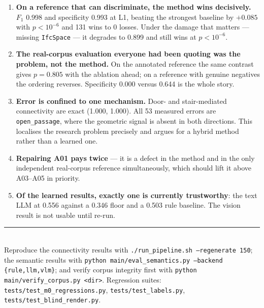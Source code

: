 \documentclass[11pt,a4paper]{article}
\newcommand{\code}[1]{\texttt{\small #1}}
\begin{document}
\begin{enumerate}
  \item \textbf{On a reference that can discriminate, the method wins
        decisively.} $F_1$ 0.998 and specificity 0.993 at L1, beating the
        strongest baseline by $+0.085$ with $p<10^{-6}$ and 131 wins to 0
        losses. Under the damage that matters --- missing \code{IfcSpace} ---
        it degrades to 0.899 and still wins at $p<10^{-6}$.
  \item \textbf{The real-corpus evaluation everyone had been quoting was the
        problem, not the method.} On the annotated reference the same contrast
        gives $p=0.805$ with the ablation ahead; on a reference with genuine
        negatives the ordering reverses. Specificity 0.000 versus 0.644 is the
        whole story.
  \item \textbf{Error is confined to one mechanism.} Door- and stair-mediated
        connectivity are exact (1.000, 1.000). All 53 measured errors are
        \code{open\_passage}, where the geometric signal is absent in both
        directions. This localises the research problem precisely and argues
        for a hybrid method rather than a learned one.
  \item \textbf{Repairing A01 pays twice} --- it is a defect in the method and
        in the only independent real-corpus reference simultaneously, which
        should lift it above A03--A05 in priority.
  \item \textbf{Of the learned results, exactly one is currently
        trustworthy}: the text LLM at 0.556 against a 0.346 floor and a 0.503
        rule baseline. The vision result is not usable until re-run.
\end{enumerate}

\vspace{4mm}
\noindent\rule{\textwidth}{0.4pt}\\[1mm]
{\small Reproduce the connectivity results with
\code{./run\_pipeline.sh --regenerate 150}; the semantic results with
\code{python main/eval\_semantics.py --backend \{rule,llm,vlm\}}; and verify
corpus integrity first with \code{python main/verify\_corpus.py <dir>}.
Regression suites: \code{tests/test\_m0\_regressions.py},
\code{tests/test\_labels.py}, \code{tests/test\_blind\_render.py}.}
\end{document}
